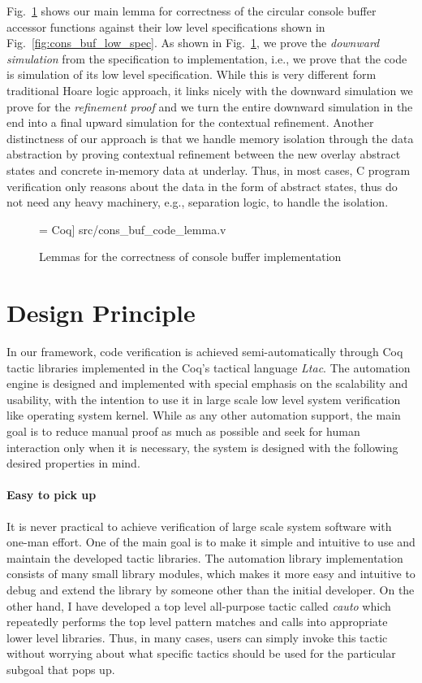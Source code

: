 Fig.~\ref{fig:cons_buf_code_lemma} shows our main lemma for correctness of
the circular console buffer accessor functions against their low level specifications
shown in Fig.~\ref{fig:cons_buf_low_spec}. As shown in Fig.~\ref{fig:cons_buf_code_lemma},
we prove the {\it downward simulation} from the specification to implementation, i.e.,
we prove that the code is simulation of its low level specification.
While this is very different form traditional Hoare logic approach, it links
nicely with the downward simulation we prove for the {\it refinement proof}
and we turn the entire downward simulation in the end into a final upward simulation
for the contextual refinement. Another distinctness of our approach is that
we handle memory isolation through the data abstraction by proving contextual
refinement between the new overlay abstract states and concrete in-memory
data at underlay. Thus, in most cases, C program verification only reasons
about the data in the form of abstract states, thus do not need any heavy
machinery, e.g., separation logic, to handle the isolation.

\begin{figure}
 = Coq] {src/cons_buf_code_lemma.v}
\caption{Lemmas for the correctness of console buffer implementation}
\label{fig:cons_buf_code_lemma}
\end{figure}

\section{Design Principle}
\label{sec:principle}

In our framework,
code verification is achieved semi-automatically through Coq tactic libraries
implemented in the Coq's tactical language \emph{Ltac}. 
The automation engine is designed and implemented with special emphasis on
the scalability and usability, with the intention to use it in large scale
low level system verification like operating system kernel.
While as any other automation support, the main goal is to reduce manual proof as much as
possible and seek for human interaction only when it is necessary,
the system is designed with the following desired properties in mind.

\paragraph{Easy to pick up}

It is never practical to achieve verification of large scale system software
with one-man effort. One of the main goal is to make it simple and intuitive
to use and maintain the developed tactic libraries. 
The automation library implementation consists of many small library modules, which
makes it more easy and intuitive to debug and extend the library by someone
other than the initial developer. On the other hand, I have developed a top level
all-purpose tactic called {\it cauto} which repeatedly performs the top level
pattern matches and calls into appropriate lower level libraries.
Thus, in many cases, users can simply invoke this tactic without worrying about
what specific tactics should be used for the particular subgoal that pops up.

